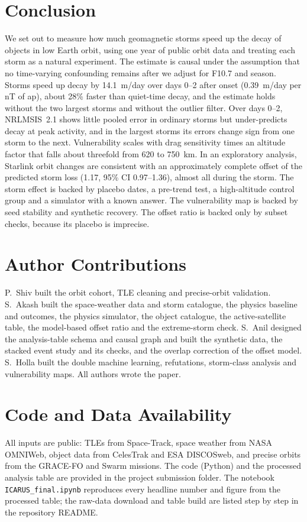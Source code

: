 \section{Conclusion}
\label{sec:conclusion}

We set out to measure how much geomagnetic storms speed up the decay of objects in low Earth
orbit, using one year of public orbit data and treating each storm as a natural experiment. The
estimate is causal under the assumption that no time-varying confounding remains after we adjust
for F10.7 and season. Storms speed up decay by 14.1~m/day over days 0--2 after onset
(0.39~m/day per nT of ap), about 28\% faster than quiet-time decay, and the estimate holds
without the two largest storms and without the outlier filter. Over days 0--2, NRLMSIS~2.1 shows
little pooled error in ordinary storms but under-predicts decay at peak activity, and in the
largest storms its errors change sign from one storm to the next. Vulnerability scales with drag
sensitivity times an altitude factor that falls about threefold from 620 to 750~km. In an
exploratory analysis, Starlink orbit changes are consistent with an approximately complete
offset of the predicted storm loss (1.17, 95\% CI 0.97--1.36), almost all during the storm. The
storm effect is backed by placebo dates, a pre-trend test, a high-altitude control group and a
simulator with a known answer. The vulnerability map is backed by seed stability and synthetic
recovery. The offset ratio is backed only by subset checks, because its placebo is imprecise.

\section*{Author Contributions}
P.~Shiv built the orbit cohort, TLE cleaning and precise-orbit validation. S.~Akash built the
space-weather data and storm catalogue, the physics baseline and outcomes, the physics simulator,
the object catalogue, the active-satellite table, the model-based offset ratio and the
extreme-storm check. S.~Anil designed the analysis-table schema and causal graph and built the
synthetic data, the stacked event study and its checks, and the overlap correction of the offset
model. S.~Holla built the double machine learning, refutations, storm-class analysis and
vulnerability maps. All authors wrote the paper.

\section*{Code and Data Availability}
All inputs are public: TLEs from Space-Track, space weather from NASA OMNIWeb, object data from
CelesTrak and ESA DISCOSweb, and precise orbits from the GRACE-FO and Swarm missions. The code
(Python) and the processed analysis table are provided in the project submission folder. The
notebook \texttt{ICARUS\_final.ipynb} reproduces every headline number and figure from the
processed table; the raw-data download and table build are listed step by step in the
repository README.
